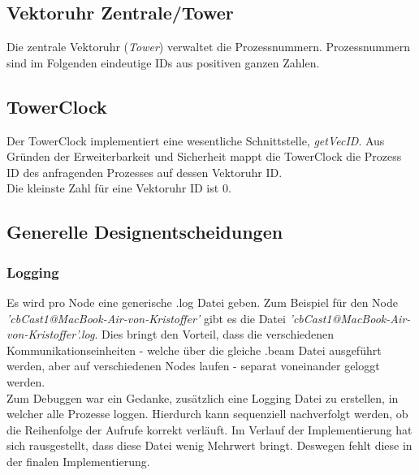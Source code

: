 \subsection{Vektoruhr Zentrale/Tower} \label{tower}

Die zentrale Vektoruhr (\textit{Tower}) verwaltet die Prozessnummern. Prozessnummern sind im Folgenden eindeutige IDs aus positiven ganzen Zahlen.

\subsection{TowerClock}

Der TowerClock implementiert eine wesentliche Schnittstelle, \textit{getVecID}. Aus Gründen der Erweiterbarkeit und Sicherheit mappt die TowerClock die Prozess ID des anfragenden Prozesses auf dessen Vektoruhr ID.
\\Die kleinste Zahl für eine Vektoruhr ID ist 0.

\subsection{Generelle Designentscheidungen}

\subsubsection{Logging}

Es wird pro Node eine generische .log Datei geben. Zum Beispiel für den Node \textit{'cbCast1@MacBook-Air-von-Kristoffer'} gibt es die Datei \textit{'cbCast1@MacBook-Air-von-Kristoffer'.log}. Dies bringt den Vorteil, dass die verschiedenen Kommunikationseinheiten - welche über die gleiche .beam Datei ausgeführt werden, aber auf verschiedenen Nodes laufen - separat voneinander geloggt werden.
\\Zum Debuggen war ein Gedanke, zusätzlich eine Logging Datei zu erstellen, in welcher alle Prozesse loggen. Hierdurch kann sequenziell nachverfolgt werden, ob die Reihenfolge der Aufrufe korrekt verläuft. Im Verlauf der Implementierung hat sich rausgestellt, dass diese Datei wenig Mehrwert bringt. Deswegen fehlt diese in der finalen Implementierung.